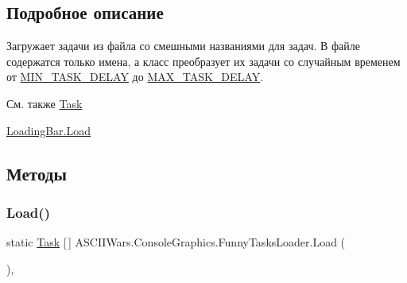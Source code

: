 \subsection{Подробное описание}
Загружает задачи из файла со смешными названиями для задач. В файле содержатся только имена, а класс преобразует их задачи со случайным временем от \hyperlink{class_a_s_c_i_i_wars_1_1_console_graphics_1_1_funny_tasks_loader_a9008864a7b23b6e86b350b5c2097151c}{M\+I\+N\+\_\+\+T\+A\+S\+K\+\_\+\+D\+E\+L\+AY} до \hyperlink{class_a_s_c_i_i_wars_1_1_console_graphics_1_1_funny_tasks_loader_a0c34f365b46e3cc7e9974d5412b05f6c}{M\+A\+X\+\_\+\+T\+A\+S\+K\+\_\+\+D\+E\+L\+AY}. 

\begin{DoxySeeAlso}{См. также}
\hyperlink{class_a_s_c_i_i_wars_1_1_console_graphics_1_1_task}{Task} 

\hyperlink{class_a_s_c_i_i_wars_1_1_console_graphics_1_1_loading_bar_a573cfd9dc72c4277e97c5fe2f358c3dd}{Loading\+Bar.\+Load} 
\end{DoxySeeAlso}


\subsection{Методы}
\hypertarget{class_a_s_c_i_i_wars_1_1_console_graphics_1_1_funny_tasks_loader_a31fd5789c12ebfb455dc594a35a8316c}{}\label{class_a_s_c_i_i_wars_1_1_console_graphics_1_1_funny_tasks_loader_a31fd5789c12ebfb455dc594a35a8316c} 
\subsubsection{\texorpdfstring{Load()}{Load()}}
{\footnotesize\ttfamily static \hyperlink{class_a_s_c_i_i_wars_1_1_console_graphics_1_1_task}{Task} \mbox{[}$\,$\mbox{]} A\+S\+C\+I\+I\+Wars.\+Console\+Graphics.\+Funny\+Tasks\+Loader.\+Load (\begin{DoxyParamCaption}{ }\end{DoxyParamCaption})\hspace{0.3cm}{\ttfamily [inline]}, {\ttfamily [static]}}



